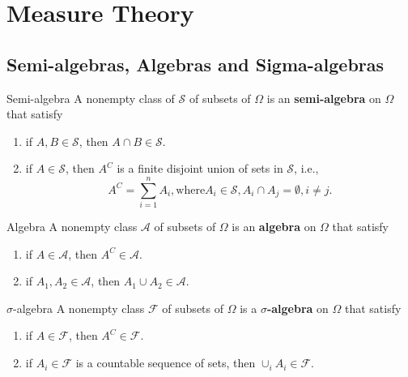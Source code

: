 \chapter{Measure Theory}

\section{Semi-algebras, Algebras and Sigma-algebras}

\begin{definition}{Semi-algebra}{}
    A nonempty class of $\mathcal{S}$ of subsets of $\Omega$ is an \textbf{semi-algebra} on $\Omega$ that satisfy
    \begin{enumerate}
        \item if $A,B\in\mathcal{S}$, then $A\cap B\in\mathcal{S}$.
        \item if $A\in\mathcal{S}$, then $A^C$ is a finite disjoint union of sets in $\mathcal{S}$, i.e., $$A^C=\sum_{i=1}^{n}A_i, \text{where} A_i\in\mathcal{S}, A_i\cap A_j=\emptyset ,i\neq j.$$
    \end{enumerate}
\end{definition}

\begin{definition}{Algebra}{}
    A nonempty class $\mathcal{A}$ of subsets of $\Omega$ is an \textbf{algebra} on $\Omega$ that satisfy
    \begin{enumerate}
        \item if $A\in\mathcal{A}$, then $A^C\in\mathcal{A}$.
        \item if $A_1, A_2\in\mathcal{A}$, then $A_1\cup A_2\in\mathcal{A}$.
    \end{enumerate}
\end{definition}



\begin{definition}{$\sigma$-algebra}{}
    A nonempty class $\mathcal{F}$ of subsets of $\Omega$ is a \textbf{$\sigma$-algebra} on $\Omega$ that satisfy
    \begin{enumerate}
        \item if $A\in\mathcal{F}$, then $A^C\in\mathcal{F}$.
        \item if $A_i\in\mathcal{F}$ is a countable sequence of sets, then $\cup_iA_i\in\mathcal{F}$.
    \end{enumerate}
\end{definition}

